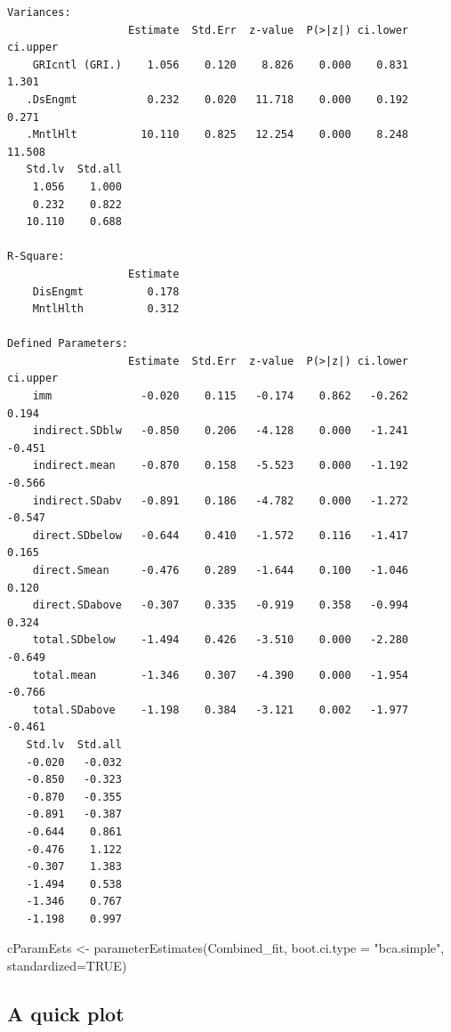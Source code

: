 \documentclass[
  11pt,
]{book}
\newenvironment{Shaded}{\begin{snugshade}}{\end{snugshade}}
\newcommand{\AttributeTok}[1]{\textcolor[rgb]{0.77,0.63,0.00}{#1}}
\newcommand{\ConstantTok}[1]{\textcolor[rgb]{0.00,0.00,0.00}{#1}}
\newcommand{\FunctionTok}[1]{\textcolor[rgb]{0.00,0.00,0.00}{#1}}
\newcommand{\NormalTok}[1]{#1}
\newcommand{\OtherTok}[1]{\textcolor[rgb]{0.56,0.35,0.01}{#1}}
\newcommand{\StringTok}[1]{\textcolor[rgb]{0.31,0.60,0.02}{#1}}
\begin{document}
\begin{verbatim}
Variances:
                   Estimate  Std.Err  z-value  P(>|z|) ci.lower ci.upper
    GRIcntl (GRI.)    1.056    0.120    8.826    0.000    0.831    1.301
   .DsEngmt           0.232    0.020   11.718    0.000    0.192    0.271
   .MntlHlt          10.110    0.825   12.254    0.000    8.248   11.508
   Std.lv  Std.all
    1.056    1.000
    0.232    0.822
   10.110    0.688

R-Square:
                   Estimate
    DisEngmt          0.178
    MntlHlth          0.312

Defined Parameters:
                   Estimate  Std.Err  z-value  P(>|z|) ci.lower ci.upper
    imm              -0.020    0.115   -0.174    0.862   -0.262    0.194
    indirect.SDblw   -0.850    0.206   -4.128    0.000   -1.241   -0.451
    indirect.mean    -0.870    0.158   -5.523    0.000   -1.192   -0.566
    indirect.SDabv   -0.891    0.186   -4.782    0.000   -1.272   -0.547
    direct.SDbelow   -0.644    0.410   -1.572    0.116   -1.417    0.165
    direct.Smean     -0.476    0.289   -1.644    0.100   -1.046    0.120
    direct.SDabove   -0.307    0.335   -0.919    0.358   -0.994    0.324
    total.SDbelow    -1.494    0.426   -3.510    0.000   -2.280   -0.649
    total.mean       -1.346    0.307   -4.390    0.000   -1.954   -0.766
    total.SDabove    -1.198    0.384   -3.121    0.002   -1.977   -0.461
   Std.lv  Std.all
   -0.020   -0.032
   -0.850   -0.323
   -0.870   -0.355
   -0.891   -0.387
   -0.644    0.861
   -0.476    1.122
   -0.307    1.383
   -1.494    0.538
   -1.346    0.767
   -1.198    0.997
\end{verbatim}

\begin{Shaded}
\begin{Highlighting}[]
\NormalTok{cParamEsts }\OtherTok{\textless{}{-}} \FunctionTok{parameterEstimates}\NormalTok{(Combined\_fit, }\AttributeTok{boot.ci.type =} \StringTok{"bca.simple"}\NormalTok{, }\AttributeTok{standardized=}\ConstantTok{TRUE}\NormalTok{)}
\end{Highlighting}
\end{Shaded}

\hypertarget{a-quick-plot}{%
\subsection{A quick plot}\label{a-quick-plot}}
\end{document}
